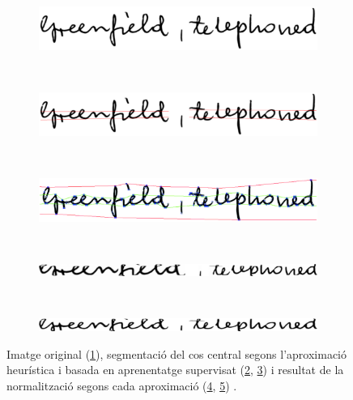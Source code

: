 \begin{figure}
\centering
\begin{subfigure}[b]{0.9\textwidth}
\centering
\includegraphics[width=\textwidth]{images/comp_seg_original.eps}
\caption{}\label{fig:comp_seg_original}
\end{subfigure}\\
\begin{subfigure}[b]{0.9\textwidth}
\centering
\includegraphics[width=\textwidth]{images/comp_seg_heur_result.eps}
\caption{}\label{fig:comp_seg_heur_result}
\end{subfigure}\\
\begin{subfigure}[b]{0.9\textwidth}
\centering
\includegraphics[width=\textwidth]{images/comp_seg_mlp_result.eps}
\caption{}\label{fig:comp_seg_mlp_result}
\end{subfigure}\\
\begin{subfigure}[b]{0.9\textwidth}
\centering
\includegraphics[width=\textwidth]{images/comp_seg_heur_norm.eps}
\caption{}\label{fig:comp_seg_heur_norm}
\end{subfigure}\\
\begin{subfigure}[b]{0.9\textwidth}
\centering
\includegraphics[width=\textwidth]{images/comp_seg_mlp_norm.eps}
\caption{}\label{fig:comp_seg_mlp_norm}
\end{subfigure}
\caption{Imatge original (\ref{fig:comp_seg_original}), segmentació del cos central segons l'aproximació heurística i basada en aprenentatge supervisat (\ref{fig:comp_seg_heur_result}, \ref{fig:comp_seg_mlp_result}) i resultat de la normalització segons cada aproximació (\ref{fig:comp_seg_heur_norm}, \ref{fig:comp_seg_mlp_norm}) \cite{DBLP:conf/pris/Gorbe-MoyaEZB08}.}\label{fig:comp_seg}
\end{figure}

